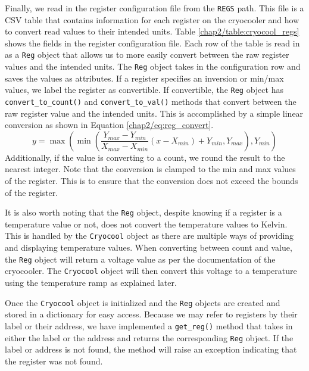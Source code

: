 Finally, we read in the register configuration file from the \texttt{REGS} path.
This file is a CSV table that contains information for each register on the cryocooler and how to convert read values to their intended units. 
Table \ref{chap2/table:cryocool_regs} shows the fields in the register configuration file.
Each row of the table is read in as a \texttt{Reg} object that allows us to more easily convert between the raw register values and the intended units.
The \texttt{Reg} object takes in the configuration row and saves the values as attributes.
If a register specifies an inversion or min/max values, we label the register as convertible. 
If convertible, the \texttt{Reg} object has \texttt{convert\_to\_count()} and \texttt{convert\_to\_val()} methods that convert between the raw register value and the intended units.
This is accomplished by a simple linear conversion as shown in Equation \ref{chap2/eq:reg_convert}.
\begin{equation}
    \label{chap2/eq:reg_convert}
    y = \max\left(\min\left(\frac{Y_{max} - Y_{min}}{X_{max} - X_{min}}\left(x - X_{min}\right) + Y_{min}, Y_{max}\right), Y_{min}\right)
\end{equation}
Additionally, if the value is converting to a count, we round the result to the nearest integer.
Note that the conversion is clamped to the min and max values of the register. 
This is to ensure that the conversion does not exceed the bounds of the register.

It is also worth noting that the \texttt{Reg} object, despite knowing if a register is a temperature value or not, does not convert the temperature values to Kelvin.
This is handled by the \texttt{Cryocool} object as there are multiple ways of providing and displaying temperature values.
When converting between count and value, the \texttt{Reg} object will return a voltage value as per the documentation of the cryocooler.
The \texttt{Cryocool} object will then convert this voltage to a temperature using the temperature ramp as explained later. 

Once the \texttt{Cryocool} object is initialized and the \texttt{Reg} objects are created and stored in a dictionary for easy access.
Because we may refer to registers by their label or their address, we have implemented a \texttt{get\_reg()} method that takes in either the label or the address and returns the corresponding \texttt{Reg} object.
If the label or address is not found, the method will raise an exception indicating that the register was not found.

